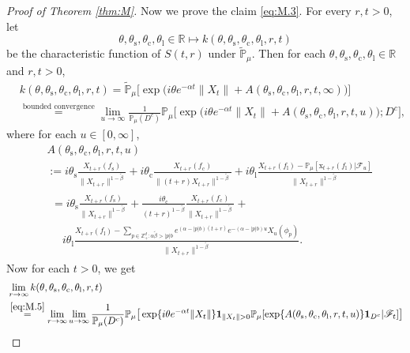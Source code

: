 \documentclass[12pt,a4paper]{amsart}
\theoremstyle{plain}
\theoremstyle{definition}
\numberwithin{equation}{section}
\begin{document}
\begin{proof}[Proof of Theorem \ref{thm:M}]
	Now we prove the claim \eqref{eq:M.3}.
	For every $r,t >0$, let
\[
	\theta,\theta_\mathrm s,\theta_\mathrm c,\theta_\mathrm l \in \mathbb R
	\mapsto k(\theta,\theta_\mathrm s,\theta_\mathrm c,\theta_\mathrm l,r,t)
\]
	be the characteristic function of  $S(t,r)$ under $\widetilde{\mathbb P}_{\mu}$.
	Then for each $\theta,\theta_\mathrm s,\theta_\mathrm c,\theta_\mathrm l\in \mathbb R$ and $r,t> 0$,
\begin{align}
	&k(\theta,\theta_\mathrm s,\theta_\mathrm c,\theta_\mathrm l,r,t)
	=\widetilde{\mathbb P}_{\mu}\big[\exp\big( i\theta e^{-\alpha t}\|X_t\|+A(\theta_\mathrm s,\theta_\mathrm c,\theta_\mathrm l,r,t,\infty)\big)\big]\\
	&\label{eq:M.5}\overset{\text{bounded convergence}}=\lim_{u\rightarrow \infty}\frac{1}{\mathbb P_{\mu}(D^c)}\mathbb P_{\mu}\big[\exp\big( i\theta e^{-\alpha t}\|X_t\|+A(\theta_\mathrm s,\theta_\mathrm c,\theta_\mathrm l,r,t,u)\big);D^c\big],
\end{align}
	where for each $u\in [0,\infty]$,
\begin{align}
	&A(\theta_\mathrm s,\theta_\mathrm c,\theta_\mathrm l,r,t,u)
	\\&:=i\theta_\mathrm s \frac{X_{t+r}(f_\mathrm s)}{\|X_{t+r}\|^{1-\tilde{\beta}}} + i\theta_\mathrm c \frac{X_{t+r}(f_\mathrm c)}{\|(t+r)X_{t+r}\|^{1-\tilde{\beta}}} + i\theta_\mathrm l  \frac{ X_{t+r}(f_\mathrm l)- \mathbb P_\mu[\mathrm x_{t+r}(f_\mathrm l)|\mathscr F_u]}{\|X_{t+r}\|^{1-\tilde{\beta}}}
	\\&\label{eq:M.6}
\begin{multlined}
	=i\theta_\mathrm s \frac{X_{t+r}(f_\mathrm s)}{\|X_{t+r}\|^{1-\tilde{\beta}}} + \frac{i\theta_\mathrm c}{(t+r)^{1-\tilde{\beta}}} \frac{X_{t+r}(f_\mathrm c)}{\|X_{t+r}\|^{1-\tilde{\beta}}} + {}
	\\\quad  i\theta_\mathrm l  \frac{ X_{t+r}(f_\mathrm l) - \sum_{p\in \mathbb Z_+^d:\alpha\tilde{\beta}>|p|b} e^{(\alpha - |p|b)(t+r)} e^{-(\alpha - |p|b)u}X_u(\phi_p) }{\|X_{t+r}\|^{1-\tilde{\beta}}}.
\end{multlined}
\end{align}
	Now for each $t>0$, we get
\begin{align}
	& \lim_{r\to \infty}k(\theta,\theta_\mathrm s,\theta_\mathrm c,\theta_\mathrm l,r,t)
	\\&\overset{\eqref{eq:M.5}}=\lim_{r\to \infty}\lim_{u\rightarrow \infty}\frac{1}{\mathbb P_{\mu}(D^c)}\mathbb P_{\mu}\big[\exp\{i\theta e^{-\alpha t}\|X_t\|\} \mathbf 1_{\|X_t\|>0} \mathbb P_{\mu}[\exp\{A(\theta_\mathrm s,\theta_\mathrm c,\theta_\mathrm l,r,t,u)\}\mathbf 1_{D^c}|\mathscr F_t]\big]

\end{align}
\end{proof}
\end{document}
